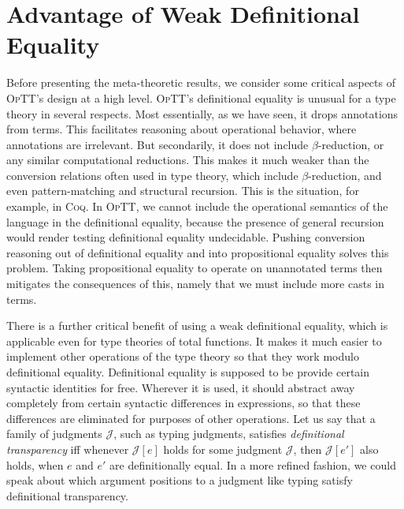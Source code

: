 \documentclass{fundam}
\newcommand{\optt}{\textsc{OpTT}}
\begin{document}
\section{Advantage of Weak Definitional Equality}
\label{sec:weak}

Before presenting the meta-theoretic results, we consider some
critical aspects of \optt's design at a high level.  \optt's
definitional equality is unusual for a type theory in several
respects.  Most essentially, as we have seen, it drops annotations
from terms.  This facilitates reasoning about operational behavior,
where annotations are irrelevant.  But secondarily, it does not
include $\beta$-reduction, or any similar computational reductions.
This makes it much weaker than the conversion relations often used in
type theory, which include $\beta$-reduction, and even
pattern-matching and structural recursion.  This is the situation, for
example, in \textsc{Coq}.  In \optt, we cannot include the operational
semantics of the language in the definitional equality, because the
presence of general recursion would render testing definitional
equality undecidable.  Pushing conversion reasoning out of
definitional equality and into propositional equality solves this
problem.  Taking propositional equality to operate on unannotated
terms then mitigates the consequences of this, namely that we must
include more casts in terms. 

There is a further critical benefit of using a weak definitional
equality, which is applicable even for type theories of total
functions.  It makes it much easier to implement other operations of
the type theory so that they work modulo definitional equality.
Definitional equality is supposed to be provide certain syntactic
identities for free.  Wherever it is used, it should abstract away
completely from certain syntactic differences in expressions, so that
these differences are eliminated for purposes of other operations.
Let us say that a family of judgments $\mathcal{J}$, such as typing
judgments, satisfies \emph{definitional transparency} iff whenever
$\mathcal{J}[e]$ holds for some judgment $\mathcal{J}$, then
$\mathcal{J}[e']$ also holds, when $e$ and $e'$ are definitionally
equal.  In a more refined fashion, we could speak about which argument
positions to a judgment like typing satisfy definitional transparency.
\end{document}
